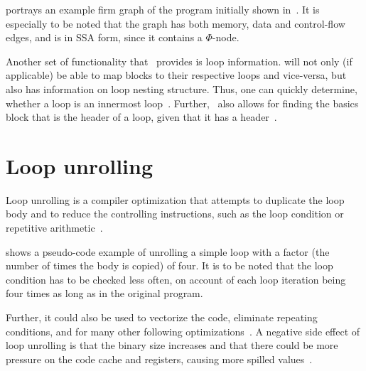  portrays an example firm graph of the program initially shown in~.
It is especially to be noted that the graph has both memory, data and control-flow edges, and is in SSA form, since it contains a $\Phi$-node.


Another set of functionality that~\libFIRM{}  provides is loop information.
\libFIRM{} will not only (if applicable) be able to map blocks to their respective loops and vice-versa, but also has information on loop nesting structure.
Thus, one can quickly determine, whether a loop is an innermost loop~\cite{libfirm}.
Further,~\libFIRM{} also allows for finding the basics block that is the header of a loop, given that it has a header~\cite{aebi18bachelorarbeit}.

\section{Loop unrolling}\label{sec:basics:unrolling}

Loop unrolling is a compiler optimization that attempts to duplicate the loop body and to reduce the controlling instructions, such as the loop condition or repetitive arithmetic~\cite{aho_ullman_1979}.

 shows a pseudo-code example of unrolling a simple loop with a factor (the number of times the body is copied) of four.
It is to be noted that the loop condition has to be checked less often, on account of each loop iteration being four times as long as in the original program.

Further, it could also be used to vectorize the code, eliminate repeating conditions, and for many other following optimizations~\cite{fog_2018}.
A negative side effect of loop unrolling is that the binary size increases and that there could be more pressure on the code cache and registers, causing more spilled values~\cite{Sarkar2001}.

